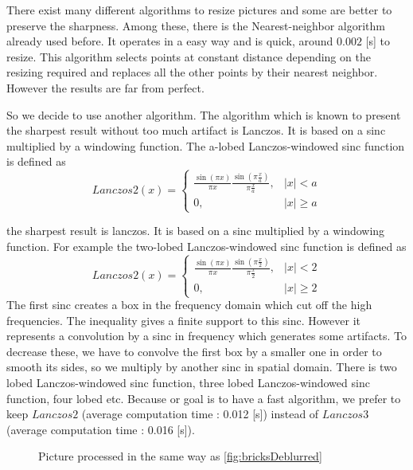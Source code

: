 There exist many different algorithms to resize pictures and some are better to preserve the sharpness. Among these, there is the Nearest-neighbor algorithm already used before. It operates in a easy way and is quick, around $0.002$ [s] to resize.  This algorithm selects points at constant distance depending on the resizing required and replaces all the other points by their nearest neighbor. %
 However the results are far from perfect.

So we decide to use another algorithm. The algorithm which is known to present %
the sharpest result without too much artifact is Lanczos. It is based on a sinc multiplied by a windowing function. The a-lobed Lanczos-windowed sinc function is defined as 
\[
Lanczos2(x) = 
\left\{  \begin{array}{cc}
\frac{\sin(\pi x )}{\pi x} \frac{\sin (\pi \frac{x}{a}) }{\pi \frac{x}{a}}, & |x| < a\\
0, & |x| \geq a
\end{array} \right. \]

the sharpest result is lanczos. It is based on a sinc multiplied by a windowing function. For example the two-lobed Lanczos-windowed sinc function is defined as
\begin{equation*}
Lanczos2(x) =
\begin{cases}
\frac{\sin(\pi x )}{\pi x} \frac{\sin (\pi \frac{x}{2}) }{\pi \frac{x}{2}}, & |x| < 2\\
0, & |x| \geq 2
\end{cases}
\end{equation*}
The first sinc creates a box in the frequency domain which cut off the high frequencies. The inequality gives a finite support to this sinc. However it represents a convolution by a sinc in frequency which generates some artifacts. To decrease these, we have to convolve the first box by a smaller one in order to smooth its sides, so we multiply by another sinc in spatial domain. 
There is two lobed Lanczos-windowed sinc function, three lobed Lanczos-windowed sinc function, four lobed etc. Because or goal is to have a fast algorithm, we prefer to keep $Lanczos2$ (average computation time :  0.012 [s]) instead of $Lanczos3$ (average computation time : 0.016 [s]). 


\begin{figure}
\centering
\label{fig:bricksLanczos}
\caption{Picture processed in the same way as \ref{fig:bricksDeblurred} }
\end{figure}
%
